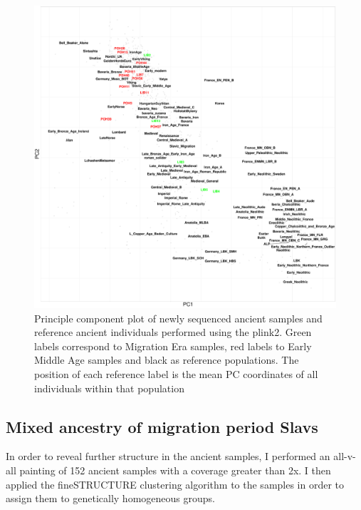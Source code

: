 \begin{figure}[htp]
    \centering
    \includegraphics[width=1.0\textwidth]{../images/chapter5/plink_pca.pdf}
    \caption{Principle component plot of newly sequenced ancient samples and reference ancient individuals performed using the plink2. Green labels correspond to Migration Era samples, red labels to Early Middle Age samples and black as reference populations. The position of each reference label is the mean PC coordinates of all individuals within that population}
    \label{fig:AllChr.plink_PCA}
\end{figure}


\subsection{Mixed ancestry of migration period Slavs}

In order to reveal further structure in the ancient samples, I performed an all-v-all painting of 152 ancient samples with a coverage greater than 2x. I then applied the fineSTRUCTURE clustering algorithm to the samples in order to assign them to genetically homogeneous groups.

